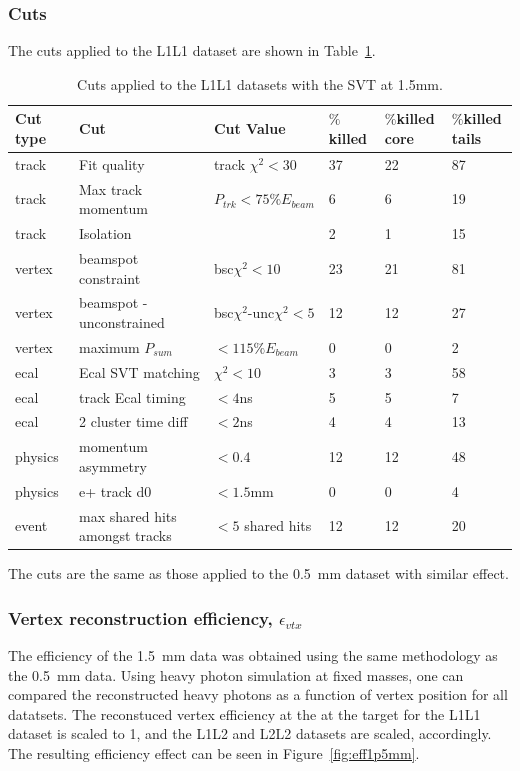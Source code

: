 \documentclass[twoside]{article}
\begin{document}
\subsubsection{Cuts}

The cuts applied to the L1L1 dataset are shown in Table~\ref{l1l1_cuts_1p5}.

\begin{table}[H]
\caption{Cuts applied to the L1L1 datasets with the SVT at 1.5mm.}
\label{l1l1_cuts_1p5}
\centering
\begin{tabular}{llllll}
\toprule
Cut type & Cut & Cut Value &  $\%$killed &  $\%$killed core & $\%$killed tails\\
\midrule
track & Fit quality & track $\chi^{2}<30$ & 37 & 22 & 87 \\
track & Max track momentum &  $P_{trk}<75\%E_{beam}$ & 6 & 6 & 19 \\
track & Isolation &   & 2 & 1 & 15 \\
vertex & beamspot constraint & bsc$\chi^{2}<10$  & 23 & 21 & 81 \\
vertex & beamspot - unconstrained & bsc$\chi^{2}$-unc$\chi^2<5$  & 12 & 12 & 27 \\
vertex & maximum $P_{sum}$ &  $<115\%E_{beam}$ & 0 & 0 & 2 \\
ecal & Ecal SVT matching & $\chi^2<10$  & 3 & 3 & 58 \\
ecal & track Ecal timing & $<4$ns  & 5 & 5 & 7 \\
ecal & 2 cluster time diff & $<2$ns  & 4 & 4 & 13 \\
physics & momentum asymmetry & $<0.4$  & 12 & 12 & 48 \\
physics & e+ track d0 & $<1.5$mm  & 0 & 0 & 4 \\
event & max shared hits amongst tracks & $<5$ shared hits  & 12 & 12 & 20 \\
\bottomrule
\end{tabular}
\end{table}

The cuts are the same as those applied to the 0.5~mm dataset with similar effect.

\subsubsection{Vertex reconstruction efficiency, $\epsilon_{vtx}$}

The efficiency of the 1.5~mm data was obtained using the same methodology as the 0.5~mm data. Using heavy photon simulation at fixed masses, one can compared the reconstructed heavy photons as a function of vertex position for all datatsets. The reconstuced vertex efficiency at the at the target for the L1L1 dataset is scaled to 1, and the L1L2 and L2L2 datasets are scaled, accordingly. The resulting efficiency effect can be seen in Figure~\ref{fig:eff1p5mm}.
\end{document}
